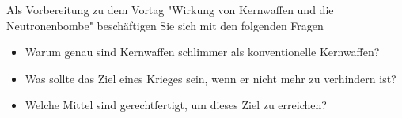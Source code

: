 \documentclass{scrartcl}
\begin{document}
	Als Vorbereitung zu dem Vortag "Wirkung von Kernwaffen und die Neutronenbombe" beschäftigen Sie sich mit den folgenden Fragen
	\begin{itemize}
		\item Warum genau sind Kernwaffen schlimmer als konventionelle Kernwaffen?
		\item Was sollte das Ziel eines Krieges sein, wenn er nicht mehr zu verhindern ist?
		\item Welche Mittel sind gerechtfertigt, um dieses Ziel zu erreichen?
	\end{itemize}
\end{document}
